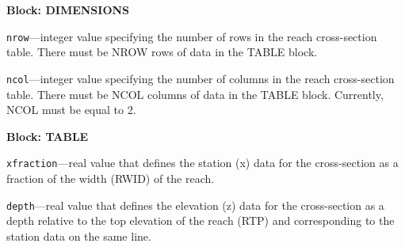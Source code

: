 
\item \textbf{Block: DIMENSIONS}

\begin{description}
\item \texttt{nrow}---integer value specifying the number of rows in the reach cross-section table. There must be NROW rows of data in the TABLE block.

\item \texttt{ncol}---integer value specifying the number of columns in the reach cross-section table. There must be NCOL columns of data in the TABLE block. Currently, NCOL must be equal to 2.

\end{description}
\item \textbf{Block: TABLE}

\begin{description}
\item \texttt{xfraction}---real value that defines the station (x) data for the cross-section as a fraction of the width (RWID) of the reach.

\item \texttt{depth}---real value that defines the elevation (z) data for the cross-section as a depth relative to the top elevation of the reach (RTP) and corresponding to the station data on the same line.

\end{description}

